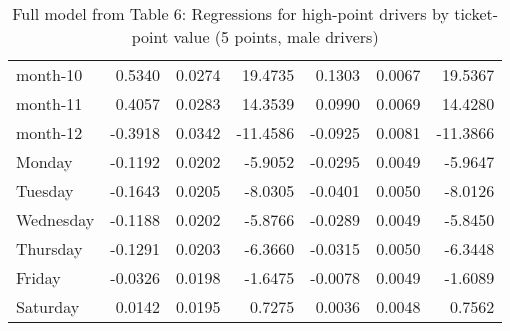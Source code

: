 \documentclass[10pt]{article}
\begin{document}
\begin{table}[ht]
\begin{tabular}{lrrrrrr}
  month-10 & 0.5340 & 0.0274 & 19.4735 & 0.1303 & 0.0067 & 19.5367 \\ 
  month-11 & 0.4057 & 0.0283 & 14.3539 & 0.0990 & 0.0069 & 14.4280 \\ 
  month-12 & -0.3918 & 0.0342 & -11.4586 & -0.0925 & 0.0081 & -11.3866 \\ 
  Monday & -0.1192 & 0.0202 & -5.9052 & -0.0295 & 0.0049 & -5.9647 \\ 
  Tuesday & -0.1643 & 0.0205 & -8.0305 & -0.0401 & 0.0050 & -8.0126 \\ 
  Wednesday & -0.1188 & 0.0202 & -5.8766 & -0.0289 & 0.0049 & -5.8450 \\ 
  Thursday & -0.1291 & 0.0203 & -6.3660 & -0.0315 & 0.0050 & -6.3448 \\ 
  Friday & -0.0326 & 0.0198 & -1.6475 & -0.0078 & 0.0049 & -1.6089 \\ 
  Saturday & 0.0142 & 0.0195 & 0.7275 & 0.0036 & 0.0048 & 0.7562 \\ 
   \hline
\end{tabular}
\caption{Full model from Table 6: Regressions for high-point drivers by ticket-point value (5 points, male drivers)} 
\label{tab_6_5_pts_no_age_M}
\end{table}


\clearpage
\pagebreak



\end{document}
